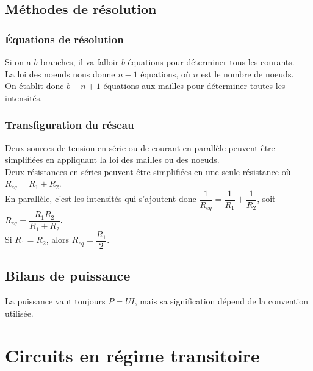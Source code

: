 \documentclass[13pt, twoside, a4paper, french]{report}
\begin{document}
        
        \section{Méthodes de résolution}\label{sec:methodes-de-resolution}
            
            \subsection{Équations de résolution}\label{subsec:equations-de-resolution}
                
                Si on a $b$ branches, il va falloir $b$ équations pour déterminer tous les courants.\\
                La loi des noeuds nous donne $n-1$ équations, où $n$ est le nombre de noeuds.\\
                On établit donc $b - n + 1$ équations aux mailles pour déterminer toutes les intensités.
            
            \subsection{Transfiguration du réseau}\label{subsec:transfiguration-du-reseau}
                
                Deux sources de tension en série ou de courant en parallèle peuvent être simplifiées en appliquant la loi des mailles ou des noeuds.\\
                
                Deux résistances en séries peuvent être simplifiées en une seule résistance où $R_{eq} = R_1 + R_2$.\\
                En parallèle, c'est les intensités qui s'ajoutent donc $\dfrac{1}{R_{eq}} = \dfrac{1}{R_1} + \dfrac{1}{R_2}$, soit $R_{eq} = \dfrac{R_1 R_2}{R_1 + R_2}$.\\
                Si $R_1 = R_2$, alors $R_{eq} = \dfrac{R_1}{2}$.\\
        
        
        \section{Bilans de puissance}\label{sec:bilans-de-puissance}
            
            La puissance vaut toujours $P = UI$, mais sa signification dépend de la convention utilisée.
    
    
    \chapter{Circuits en régime transitoire}\label{ch:circuits-en-regime-transitoire}
        
\end{document}

